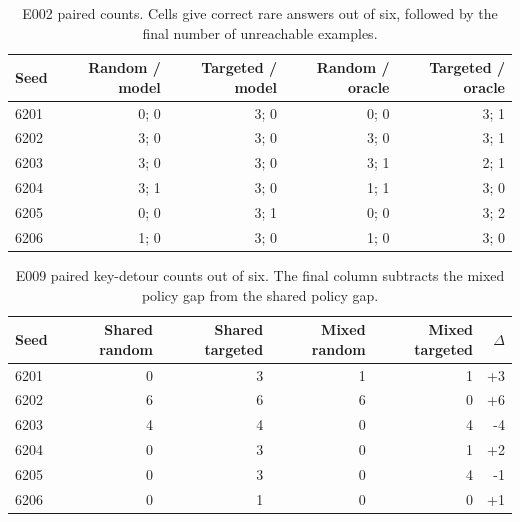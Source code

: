 \begin{table}[H]
\centering
\small
\caption{E002 paired counts. Cells give correct rare answers out of six, followed by the final number of unreachable examples.}
\begin{tabular}{lrrrr}
\toprule
Seed & Random / model & Targeted / model & Random / oracle & Targeted / oracle \\
\midrule
6201 & 0; 0 & 3; 0 & 0; 0 & 3; 1 \\
6202 & 3; 0 & 3; 0 & 3; 0 & 3; 1 \\
6203 & 3; 0 & 3; 0 & 3; 1 & 2; 1 \\
6204 & 3; 1 & 3; 0 & 1; 1 & 3; 0 \\
6205 & 0; 0 & 3; 1 & 0; 0 & 3; 2 \\
6206 & 1; 0 & 3; 0 & 1; 0 & 3; 0 \\
\bottomrule
\end{tabular}
\end{table}

\begin{table}[H]
\centering
\small
\caption{E009 paired key-detour counts out of six. The final column subtracts the mixed policy gap from the shared policy gap.}
\begin{tabular}{lrrrrr}
\toprule
Seed & Shared random & Shared targeted & Mixed random & Mixed targeted & $\Delta$ \\
\midrule
6201 & 0 & 3 & 1 & 1 & +3 \\
6202 & 6 & 6 & 6 & 0 & +6 \\
6203 & 4 & 4 & 0 & 4 & -4 \\
6204 & 0 & 3 & 0 & 1 & +2 \\
6205 & 0 & 3 & 0 & 4 & -1 \\
6206 & 0 & 1 & 0 & 0 & +1 \\
\bottomrule
\end{tabular}
\end{table}
